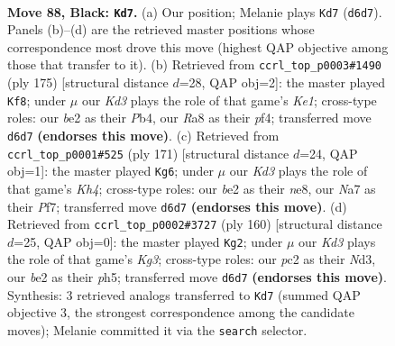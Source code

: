 \documentclass[11pt]{article}
\begin{document}
\clearpage

\begin{figure}[p]\centering
\begin{subfigure}{0.46\textwidth}\centering
\resizebox{\linewidth}{!}{%
\newchessgame
\chessboard[
  setfen={r7/n7/P2k4/8/8/1R4PP/2P1BK2/8 b - - 10 88},
  showmover=false,
  pgfstyle=straightmove, color=movearrow, markmove={d6-d7}
]}
\caption{}
\end{subfigure}\hfill
\begin{subfigure}{0.46\textwidth}\centering
\resizebox{\linewidth}{!}{%
\newchessgame
\chessboard[
  setfen={4k3/5p2/4r3/8/1p3PP1/1P3K2/P2R4/8 b - - 1 88},
  showmover=false,
  pgfstyle=straightmove, color=movearrow, markmove={e8-f8}
]}
\caption{}
\end{subfigure}
\\[4pt]
\begin{subfigure}{0.46\textwidth}\centering
\resizebox{\linewidth}{!}{%
\newchessgame
\chessboard[
  setfen={4N3/5p2/4n3/r6k/8/6PK/1R3P2/8 b - - 72 86},
  showmover=false,
  pgfstyle=straightmove, color=movearrow, markmove={h5-g6}
]}
\caption{}
\end{subfigure}\hfill
\begin{subfigure}{0.46\textwidth}\centering
\resizebox{\linewidth}{!}{%
\newchessgame
\chessboard[
  setfen={8/5p2/6p1/1r4kp/8/R2N2K1/8/8 w - - 14 81},
  showmover=false,
  pgfstyle=straightmove, color=movearrow, markmove={g3-g2}
]}
\caption{}
\end{subfigure}
\caption{\textbf{Move 88, Black: \texttt{Kd7}.} (a) Our position; Melanie plays \texttt{Kd7} (\texttt{d6d7}). Panels (b)--(d) are the retrieved master positions whose correspondence most drove this move (highest QAP objective among those that transfer to it). (b) Retrieved from \texttt{ccrl\_top\_p0003\#1490} (ply 175) [structural distance $d$=28, QAP obj=2]: the master played \texttt{Kf8}; under $\mu$ our \emph{Kd3} plays the role of that game's \emph{Ke1}; cross-type roles: our \emph{b}e2 as their \emph{P}b4, our \emph{R}a8 as their \emph{p}f4; transferred move \texttt{d6d7} \textbf{(endorses this move)}. (c) Retrieved from \texttt{ccrl\_top\_p0001\#525} (ply 171) [structural distance $d$=24, QAP obj=1]: the master played \texttt{Kg6}; under $\mu$ our \emph{Kd3} plays the role of that game's \emph{Kh4}; cross-type roles: our \emph{b}e2 as their \emph{n}e8, our \emph{N}a7 as their \emph{P}f7; transferred move \texttt{d6d7} \textbf{(endorses this move)}. (d) Retrieved from \texttt{ccrl\_top\_p0002\#3727} (ply 160) [structural distance $d$=25, QAP obj=0]: the master played \texttt{Kg2}; under $\mu$ our \emph{Kd3} plays the role of that game's \emph{Kg3}; cross-type roles: our \emph{p}c2 as their \emph{N}d3, our \emph{b}e2 as their \emph{p}h5; transferred move \texttt{d6d7} \textbf{(endorses this move)}. Synthesis: 3 retrieved analogs transferred to \texttt{Kd7} (summed QAP objective 3, the strongest correspondence among the candidate moves); Melanie committed it via the \texttt{search} selector.}
\label{fig:thought-m175}
\end{figure}
\end{document}
